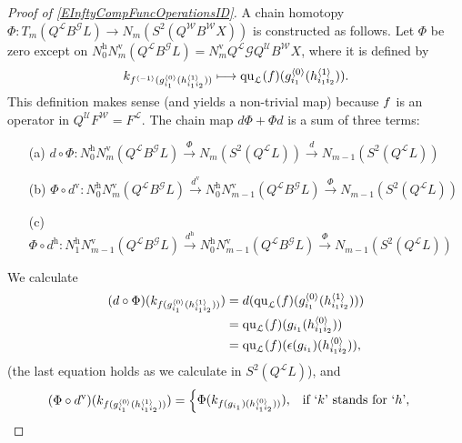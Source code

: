 \documentclass[11pt]{amsart} \renewcommand{\baselinestretch}{1.4}
\theoremstyle{plain}
\theoremstyle{definition}
\renewcommand{\to}{\longrightarrow}
\newcommand{\squishlist}{
  \setlength{\itemsep}{.5pt}
  \setlength{\parskip}{0pt}
  \setlength{\parsep}{0pt}}
\newcommand{\scrG}{\mathscr{G}}
\newcommand{\calU}{\mathcal{U}}
\newcommand{\calL}{\mathcal{L}}
\newcommand{\calw}{\mathcal{W}}
\newcommand{\call}{\mathcal{L}}
\newcommand{\BSW}{{\scrG}}
\newcommand{\BSWres}{B^\BSW}%
\newcommand{\quadratic}{\mathrm{qu}}
\newcommand{\uver}{^\mathrm{v}}
\newcommand{\uhor}{^\mathrm{h}}
\renewcommand{\mapsto}{\longmapsto}
\begin{document}
\begin{Operations in composite functor spectral sequences}
\begin{proof}[Proof of \ref{EInftyCompFuncOperationsID}]
A chain homotopy $\Phi:T_m(Q^{\calL}\BSWres L)\to N_m(S^2(Q^{\calw}B^{\calw}X))$ is constructed as follows. Let $\Phi$ be zero except on 
$N\uhor_0N\uver_m (Q^{\call}\BSWres L)=N\uver_mQ^{\calL}\BSW Q^{\calU}B^{\calw}X$,
where it is defined by
\[\smash{k_{f^{\langle -1\rangle}(g^{\smash{\langle} 0\smash{\rangle}}_{i_1}(h^{\smash{\langle} 1\smash{\rangle}}_{i_1i_2}))}}\mapsto {\quadratic_\call}(f)(g^{\smash{\langle} 0\smash{\rangle}}_{i_1}(h^{\smash{\langle} 1\smash{\rangle}}_{i_1i_2})).\]
This definition makes sense (and yields a non-trivial map) because $f\relax $ is an operator in $Q^{\calU}F^{\calw}=F^{\calL}$.
The chain map $d\Phi+\Phi d$ is a sum of three terms:
\begin{enumerate}\squishlist
\setlength{\parindent}{.25in}
\item[(a)] $d\circ\Phi:N\uhor_0N\uver_m (Q^{\call}\BSWres L)\overset{\Phi}{\to} N_m(S^2(Q^{\call}L))\overset{d}{\to} N_{m-1}(S^2(Q^{\call}L))$ 
\item[(b)] $\Phi\circ d\uver:N\uhor_0N\uver_{m} (Q^{\call}\BSWres L)\overset{d\uver}{\to} N\uhor_0N\uver_{m-1}(Q^{\call}\BSWres L)\overset{\Phi}{\to} N_{m-1}(S^2(Q^{\call}L))$
\item[(c)] $\Phi\circ d\uhor:N\uhor_1N\uver_{m-1}(Q^{\call}\BSWres L)\overset{d\uhor}{\to} N\uhor_0N\uver_{m-1}(Q^{\call}\BSWres L)\overset{\Phi}{\to} N_{m-1}(S^2(Q^{\call}L))$
\end{enumerate}
We calculate
\begin{alignat*}{2}
(d\circ\Phi)(k_{f\relax (g^{\smash{\langle} 0\smash{\rangle}}_{i_1}(h^{\smash{\langle} 1\smash{\rangle}}_{i_1i_2}))})&=d( {\quadratic_\call}(f)(g^{\smash{\langle} 0\smash{\rangle}}_{i_1}(h^{\smash{\langle} 1\smash{\rangle}}_{i_1i_2})))\\
&={\quadratic_\call}(f)(g\relax _{i_1}(h^{\smash{\langle} 0\smash{\rangle}}_{i_1i_2}))\\
&={\quadratic_\call}(f)(\epsilon(g\relax _{i_1})(h^{\smash{\langle} 0\smash{\rangle}}_{i_1i_2})),
\end{alignat*}
(the last equation holds as we calculate in $S^2(Q^{\call}L)$), and 
\begin{alignat*}{2}
(\Phi\circ d\uver)(k_{f\relax (g^{\smash{\langle} 0\smash{\rangle}}_{i_1}(h^{\smash{\langle} 1\smash{\rangle}}_{i_1i_2}))})&=\begin{cases}
\Phi( k_{f\relax (g\relax _{i_1})(h^{\smash{\langle} 0\smash{\rangle}}_{i_1i_2}))}),&\textup{if `$k$' stands for `$h$'},\\

\end{cases}
\end{alignat*}
\end{proof}
\end{Operations in composite functor spectral sequences}
\end{document}
